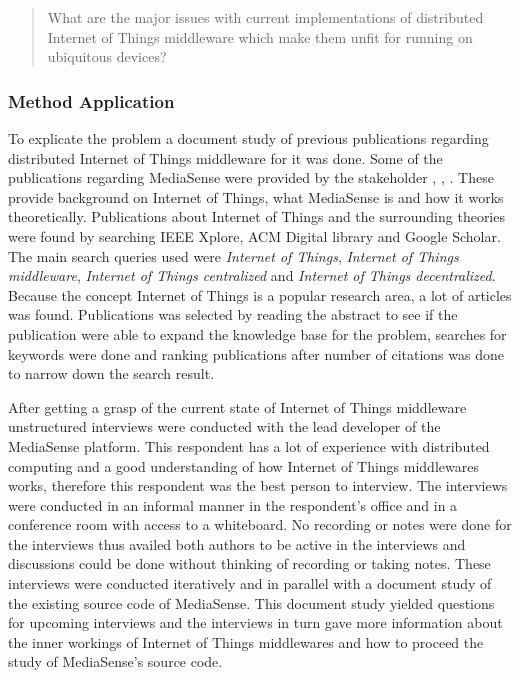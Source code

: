 \begin{quotation}
What are the major issues with current implementations of distributed Internet of Things middleware which make them unfit for running on ubiquitous devices?
\end{quotation}

\subsubsection{Method Application}
To explicate the problem a document study of previous publications regarding distributed Internet of Things middleware for it was done. Some of the publications regarding MediaSense were provided by the stakeholder \cite{TheMediaSenseFramework}, \cite{Kanter539187}, \cite{Walters413794}. These provide background on Internet of Things, what MediaSense is and how it works theoretically. Publications about Internet of Things and the surrounding theories were found by searching IEEE Xplore, ACM Digital library and Google Scholar. The main search queries used were \emph{Internet of Things}, \emph{Internet of Things middleware}, \emph{Internet of Things centralized} and \emph{Internet of Things decentralized}. Because the concept Internet of Things is a popular research area, a lot of articles was found. Publications was selected by reading the abstract to see if the publication were able to expand the knowledge base for the problem, searches for keywords were done and ranking publications after number of citations was done to narrow down the search result. 

After getting a grasp of the current state of Internet of Things middleware unstructured interviews were conducted with the lead developer of the MediaSense platform. This respondent has a lot of experience with distributed computing and a good understanding of how Internet of Things middlewares works, therefore this respondent was the best person to interview. The interviews were conducted in an informal manner in the respondent's office and in a conference room with access to a whiteboard. No recording or notes were done for the interviews thus availed both authors to be active in the interviews and discussions could be done without thinking of recording or taking notes. These interviews were conducted iteratively and in parallel with a document study of the existing source code of MediaSense. This document study yielded questions for upcoming interviews and the interviews in turn gave more information about the inner workings of Internet of Things middlewares and how to proceed the study of MediaSense's source code.

